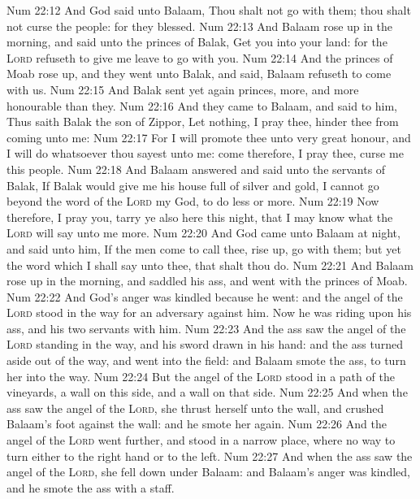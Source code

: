 \vs Num 22:12 And God said unto Balaam, Thou shalt not go with them; thou shalt not curse the people: for they  blessed.
\vs Num 22:13 And Balaam rose up in the morning, and said unto the princes of Balak, Get you into your land: for the \textsc{Lord} refuseth to give me leave to go with you.
\vs Num 22:14 And the princes of Moab rose up, and they went unto Balak, and said, Balaam refuseth to come with us.
\vs Num 22:15 And Balak sent yet again princes, more, and more honourable than they.
\vs Num 22:16 And they came to Balaam, and said to him, Thus saith Balak the son of Zippor, Let nothing, I pray thee, hinder thee from coming unto me:
\vs Num 22:17 For I will promote thee unto very great honour, and I will do whatsoever thou sayest unto me: come therefore, I pray thee, curse me this people.
\vs Num 22:18 And Balaam answered and said unto the servants of Balak, If Balak would give me his house full of silver and gold, I cannot go beyond the word of the \textsc{Lord} my God, to do less or more.
\vs Num 22:19 Now therefore, I pray you, tarry ye also here this night, that I may know what the \textsc{Lord} will say unto me more.
\vs Num 22:20 And God came unto Balaam at night, and said unto him, If the men come to call thee, rise up,  go with them; but yet the word which I shall say unto thee, that shalt thou do.
\vs Num 22:21 And Balaam rose up in the morning, and saddled his ass, and went with the princes of Moab.
\vs Num 22:22 And God's anger was kindled because he went: and the angel of the \textsc{Lord} stood in the way for an adversary against him. Now he was riding upon his ass, and his two servants  with him.
\vs Num 22:23 And the ass saw the angel of the \textsc{Lord} standing in the way, and his sword drawn in his hand: and the ass turned aside out of the way, and went into the field: and Balaam smote the ass, to turn her into the way.
\vs Num 22:24 But the angel of the \textsc{Lord} stood in a path of the vineyards, a wall  on this side, and a wall on that side.
\vs Num 22:25 And when the ass saw the angel of the \textsc{Lord}, she thrust herself unto the wall, and crushed Balaam's foot against the wall: and he smote her again.
\vs Num 22:26 And the angel of the \textsc{Lord} went further, and stood in a narrow place, where  no way to turn either to the right hand or to the left.
\vs Num 22:27 And when the ass saw the angel of the \textsc{Lord}, she fell down under Balaam: and Balaam's anger was kindled, and he smote the ass with a staff.
